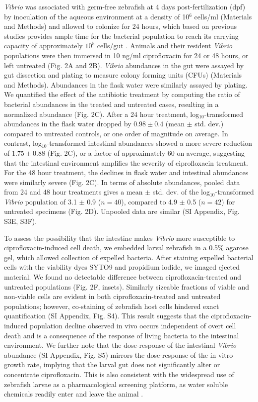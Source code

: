 \textit{Vibrio} was associated with germ-free zebrafish at 4 days post-fertilization (dpf) by inoculation of the aqueous environment at a density of 10$^6$ cells/ml (Materials and Methods) and allowed to colonize for 24 hours, which based on previous studies provides ample time for the bacterial population to reach its carrying capacity of approximately $10^5$ cells/gut \cite{Wiles2016}. Animals and their resident \textit{Vibrio} populations were then immersed in 10 ng/ml ciprofloxacin for 24 or 48 hours, or left untreated (Fig. 2A and 2B). \textit{Vibrio} abundances in the gut were assayed by gut dissection and plating to measure colony forming units (CFUs) (Materials and Methods). Abundances in the flask water were similarly assayed by plating. We quantified the effect of the antibiotic treatment by computing the ratio of bacterial abundances in the treated and untreated cases, resulting in a normalized abundance (Fig. 2C). After a 24 hour treatment, log$_{10}$-transformed abundances in the flask water dropped by $0.98 \pm 0.4$ (mean $\pm$ std. dev.) compared to untreated controls, or one order of magnitude on average. In contrast, log$_{10}$-transformed intestinal abundances showed a more severe reduction of $1.75 \pm 0.88$ (Fig. 2C), or a factor of approximately 60 on average, suggesting that the intestinal environment amplifies the severity of ciprofloxacin treatment. For the 48 hour treatment, the declines in flask water and intestinal abundances were similarly severe (Fig. 2C). In terms of absolute abundances, pooled data from 24 and 48 hour treatments gives a mean $\pm$ std. dev. of the log$_{10}$-transformed \textit{Vibrio} population of 3.1 $\pm$ 0.9 ($n = 40$), compared to 4.9 $\pm$ 0.5 ($n = 42$) for untreated specimens (Fig. 2D). Unpooled data are similar (SI Appendix, Fig. S3E, S3F).  


To assess the possibility that the intestine makes \textit{Vibrio} more susceptible to ciprofloxacin-induced cell death, we embedded larval zebrafish in a 0.5\% agarose gel, which allowed collection of expelled bacteria. After staining expelled bacterial cells with the viability dyes SYTO9 and propidium iodide, we imaged ejected material. We found  no detectable difference between ciprofloxacin-treated and untreated populations (Fig. 2F, insets). Similarly sizeable fractions of viable and non-viable cells are evident in both ciprofloxacin-treated and untreated populations; however, co-staining of zebrafish host cells hindered exact quantification (SI Appendix, Fig. S4). This result suggests that the ciprofloxacin-induced population decline observed in vivo occurs independent of overt cell death and is a consequence of the response of living bacteria to the intestinal environment. We further note that the dose-response of the intestinal \textit{Vibrio} abundance (SI Appendix, Fig. S5) mirrors the dose-response of the in vitro growth rate, implying that the larval gut does not significantly alter or concentrate ciprofloxacin. This is also consistent with the widespread use of zebrafish larvae as a  pharmacological screening platform, as water soluble chemicals readily enter and leave the animal \cite{rennekamp201515,yoganantharjah2017use}.

